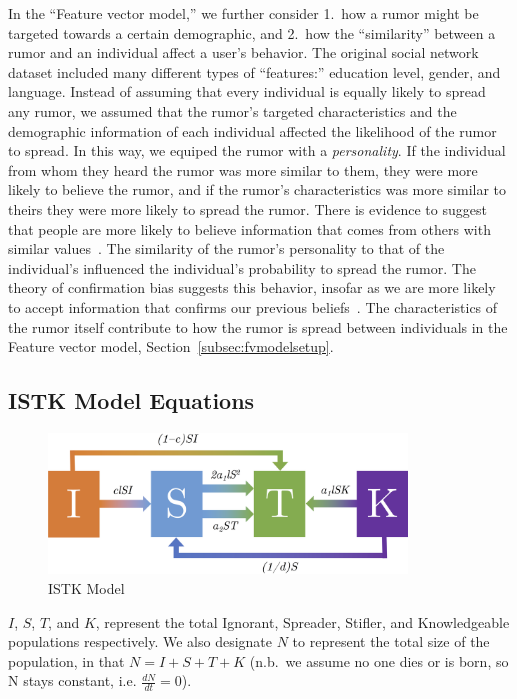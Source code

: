 In the ``Feature vector model,'' we further consider 1.\ how a rumor might be targeted towards a certain demographic, and 2.\ how the ``similarity'' between a rumor and an individual affect a user's behavior.
The original social network dataset included many different types of ``features:'' education level, gender, and language.
Instead of assuming that every individual is equally likely to spread any rumor, we assumed that the rumor's targeted characteristics and the demographic information of each individual affected the likelihood of the rumor to spread.
In this way, we equiped the rumor with a \textit{personality}.
If the individual from whom they heard the rumor was more similar to them, they were more likely to believe the rumor, and if the rumor's characteristics was more similar to theirs they were more likely to spread the rumor.
There is evidence to suggest that people are more likely to believe information that comes from others with similar values~\cite{gillespie-2004}.
The similarity of the rumor's personality to that of the individual's influenced the individual's probability to spread the rumor.
The theory of confirmation bias suggests this behavior, insofar as we are more likely to accept information that confirms our previous beliefs~\cite{wason-1960}.
The characteristics of the rumor itself contribute to how the rumor is spread between individuals in the Feature vector model, Section~\ref{subsec:fvmodelsetup}.

\subsection{ISTK Model Equations}
\label{subsec:istkeqns}

\begin{figure}[H]
\captionsetup{width=0.6\textwidth}
\centering
    \includegraphics[width=0.85\textwidth]{figures/flow-chart}
  \caption{ ISTK Model}
\label{fig:flow-chart}
\end{figure}

\noindent $ I $, $ S $, $ T $, and $ K $, represent the total Ignorant, Spreader, Stifler, and Knowledgeable populations respectively.
We also designate $ N $ to represent the total size of the population, in that $ N = I + S + T + K $ (n.b.\ we assume no one dies or is born, so N stays constant, i.e. $\frac{dN}{dt} = 0$).

